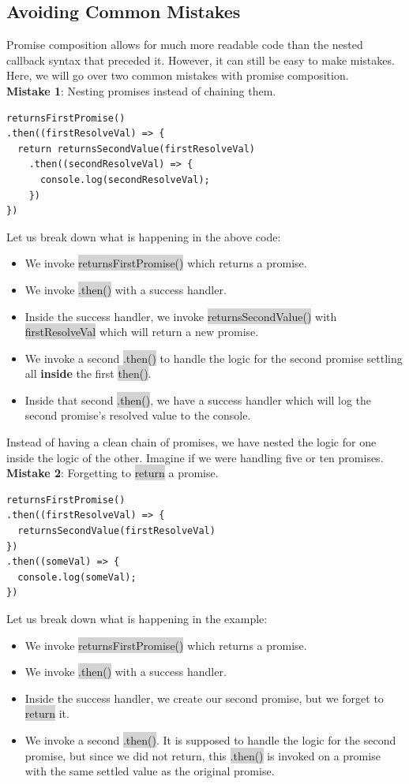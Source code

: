 \documentclass[11pt]{article}
\begin{document}
\subsection{Avoiding Common Mistakes}
Promise composition allows for much more readable code than the nested callback syntax that preceded it. However, it can still be easy to make mistakes. Here, we will go over two common mistakes with promise composition. \\
\newline
\textbf{Mistake 1}: Nesting promises instead of chaining them.
\begin{lstlisting}
returnsFirstPromise()
.then((firstResolveVal) => {
  return returnsSecondValue(firstResolveVal)
    .then((secondResolveVal) => {
      console.log(secondResolveVal);
    })
})
\end{lstlisting}
Let us break down what is happening in the above code:
\begin{itemize}[leftmargin = *]
\item We invoke \colorbox{lightgray}{returnsFirstPromise()} which returns a promise.
\item We invoke \colorbox{lightgray}{.then()} with a success handler.
\item Inside the success handler, we invoke \colorbox{lightgray}{returnsSecondValue()} with \colorbox{lightgray}{firstResolveVal} which will return a new promise.
\item We invoke a second \colorbox{lightgray}{.then()} to handle the logic for the second promise settling all \textbf{inside} the first \colorbox{lightgray}{then()}.
\item Inside that second \colorbox{lightgray}{.then()}, we have a success handler which will log the second promise’s resolved value to the console.
\end{itemize}
Instead of having a clean chain of promises, we have nested the logic for one inside the logic of the other. Imagine if we were handling five or ten promises. \\
\newline
\textbf{Mistake 2}: Forgetting to \colorbox{lightgray}{return} a promise.
\begin{lstlisting}
returnsFirstPromise()
.then((firstResolveVal) => {
  returnsSecondValue(firstResolveVal)
})
.then((someVal) => {
  console.log(someVal);
})
\end{lstlisting}
Let us break down what is happening in the example:
\begin{itemize}[leftmargin = *]
\item We invoke \colorbox{lightgray}{returnsFirstPromise()} which returns a promise.
\item We invoke \colorbox{lightgray}{.then()} with a success handler.
\item Inside the success handler, we create our second promise, but we forget to \colorbox{lightgray}{return} it. 
\item We invoke a second \colorbox{lightgray}{.then()}. It is supposed to handle the logic for the second promise, but since we did not return, this \colorbox{lightgray}{.then()} is invoked on a promise with the same settled value as the original promise.
\end{itemize}
\end{document}
